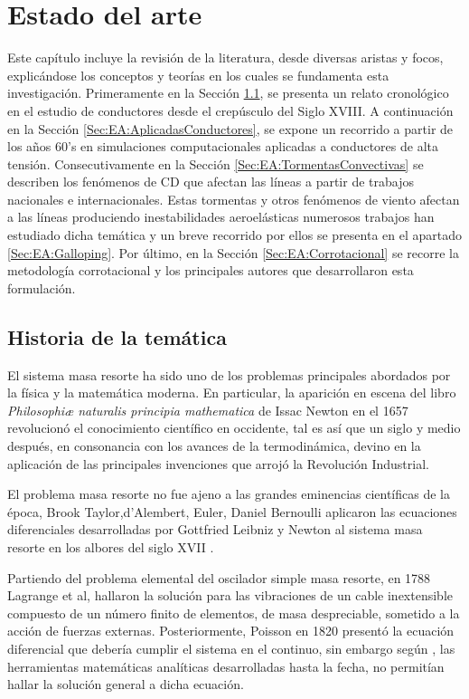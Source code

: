 \chapter{Estado del arte}\label{Cap:EstadoDelArte}\linenumbers

Este capítulo incluye la revisión de la literatura, desde diversas aristas y focos, explicándose los conceptos y teorías en los cuales se fundamenta esta investigación. Primeramente en la Sección \ref{Sec:EA:Historia}, se presenta un relato cronológico en el estudio de conductores desde el crepúsculo del Siglo XVIII. A continuación en la Sección \ref{Sec:EA:AplicadasConductores}, se expone un recorrido a partir de los años 60's en simulaciones computacionales aplicadas a conductores de alta tensión. Consecutivamente en la Sección \ref{Sec:EA:TormentasConvectivas} se describen los fenómenos de CD que afectan las líneas a partir de trabajos nacionales e internacionales. Estas tormentas y otros fenómenos de viento afectan a las líneas produciendo inestabilidades aeroelásticas numerosos trabajos han estudiado dicha temática y un breve recorrido por ellos se presenta en el apartado \ref{Sec:EA:Galloping}. Por último, en la Sección \ref{Sec:EA:Corrotacional} se recorre la metodología corrotacional y los principales autores que desarrollaron esta formulación. 

\section{Historia de la temática}\label{Sec:EA:Historia}
El sistema masa resorte ha sido uno de los problemas principales abordados por la física y la matemática moderna. En particular, la aparición en escena del libro \emph{Philosophiæ naturalis principia mathematica} de Issac Newton en el 1657 revolucionó el conocimiento científico en occidente, tal es así que  un siglo y medio después, en consonancia con los avances de la termodinámica, devino en la aplicación de las principales invenciones que arrojó la Revolución Industrial.

El problema masa resorte no fue ajeno a las grandes eminencias científicas de la época, Brook Taylor,d'Alembert, Euler, Daniel Bernoulli aplicaron las ecuaciones diferenciales desarrolladas por Gottfried Leibniz y Newton al sistema masa resorte en los albores del siglo XVII \citep{Starossek1991}.  

Partiendo del problema elemental del oscilador simple masa resorte, en 1788 Lagrange et al, hallaron la solución para las vibraciones de un cable inextensible compuesto de un número finito de elementos, de masa despreciable, sometido a la acción de fuerzas externas. Posteriormente, Poisson en 1820 presentó la ecuación diferencial que debería cumplir el sistema en el continuo, sin embargo según \citep{Irvine1974}, las herramientas matemáticas analíticas desarrolladas hasta la fecha, no permitían hallar la solución general a dicha ecuación.

